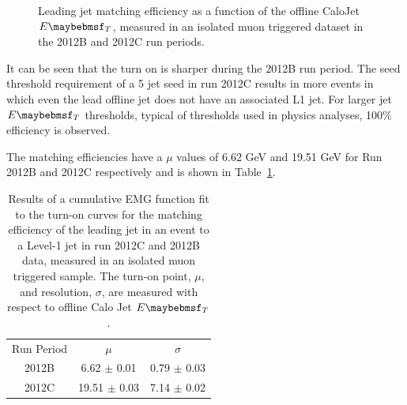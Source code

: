 \begin{figure}[htp]
\centering
{}
\caption[Leading jet matching efficiency as a function of the offline CaloJet $\et$.]{Leading jet matching efficiency as a function of the offline CaloJet $\et$, measured in an isolated muon triggered dataset in the 2012B and 2012C run periods.}
  \label{fig:leadjetmatcheff}
\end{figure}

It can be seen that the turn on is sharper during the 2012B run
period. The seed threshold requirement of a 5 \GeV jet seed in run 2012C results
in more events in which even the lead offline jet does not have an associated L1 jet. For larger jet $\et$
thresholds, typical of thresholds used in physics analyses, 100$\%$ efficiency is observed.

The matching efficiencies have a $\mu$ values of 6.62 GeV and 19.51 GeV for Run 2012B and 2012C respectively and is shown in Table~\ref{tab:matcheff}. 

\begin{table}
\begin{center}
\begin{tabular*}{0.5\textwidth}{|c|c|c|}
\cline{1-3}
Run Period & $\mu$ & $\sigma$ \\ \cline {1-3}
2012B & 6.62 $\pm$ 0.01 & 0.79 $\pm$ 0.03  \\ \cline{1-3}
2012C & 19.51 $\pm$ 0.03 & 7.14 $\pm$ 0.02 \\ \cline{1-3}
\end{tabular*}
\caption[Results of a cumulative EMG function fit to the turn-on
curves for the matching efficiency of the leading jet in an event to
a Level-1 jet in run 2012C and 2012B data.]{Results of a cumulative EMG function fit to the turn-on
curves for the matching efficiency of the leading jet in an event to
a Level-1 jet in run 2012C and 2012B data, measured in an isolated
muon triggered sample. The turn-on point, $\mu$, and resolution, $\sigma$, are measured with respect to offline Calo Jet $\et$.} \label{tab:matcheff}
\end{center}
\end{table}

